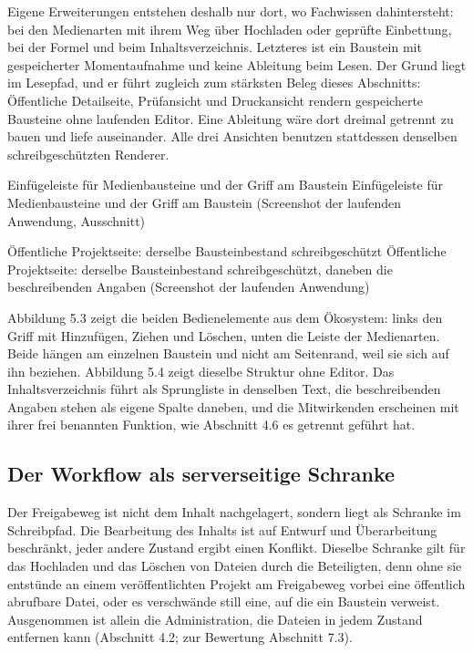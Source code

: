 Eigene Erweiterungen entstehen deshalb nur dort, wo Fachwissen dahintersteht: bei den Medienarten mit ihrem Weg über Hochladen oder geprüfte Einbettung, bei der Formel und beim Inhaltsverzeichnis. Letzteres ist ein Baustein mit gespeicherter Momentaufnahme und keine Ableitung beim Lesen. Der Grund liegt im Lesepfad, und er führt zugleich zum stärksten Beleg dieses Abschnitts: Öffentliche Detailseite, Prüfansicht und Druckansicht rendern gespeicherte Bausteine ohne laufenden Editor. Eine Ableitung wäre dort dreimal getrennt zu bauen und liefe auseinander. Alle drei Ansichten benutzen stattdessen denselben schreibgeschützten Renderer.

%
{Einfügeleiste für Medienbausteine und der Griff am Baustein}%
{Einfügeleiste für Medienbausteine und der Griff am Baustein (Screenshot der laufenden Anwendung, Ausschnitt)}

%
{Öffentliche Projektseite: derselbe Bausteinbestand schreibgeschützt}%
{Öffentliche Projektseite: derselbe Bausteinbestand schreibgeschützt, daneben die beschreibenden Angaben (Screenshot der laufenden Anwendung)}

Abbildung 5.3 zeigt die beiden Bedienelemente aus dem Ökosystem: links den Griff mit Hinzufügen, Ziehen und Löschen, unten die Leiste der Medienarten. Beide hängen am einzelnen Baustein und nicht am Seitenrand, weil sie sich auf ihn beziehen. Abbildung 5.4 zeigt dieselbe Struktur ohne Editor. Das Inhaltsverzeichnis führt als Sprungliste in denselben Text, die beschreibenden Angaben stehen als eigene Spalte daneben, und die Mitwirkenden erscheinen mit ihrer frei benannten Funktion, wie Abschnitt 4.6 es getrennt geführt hat.

\subsection{Der Workflow als serverseitige Schranke}

Der Freigabeweg ist nicht dem Inhalt nachgelagert, sondern liegt als Schranke im Schreibpfad. Die Bearbeitung des Inhalts ist auf Entwurf und Überarbeitung beschränkt, jeder andere Zustand ergibt einen Konflikt. Dieselbe Schranke gilt für das Hochladen und das Löschen von Dateien durch die Beteiligten, denn ohne sie entstünde an einem veröffentlichten Projekt am Freigabeweg vorbei eine öffentlich abrufbare Datei, oder es verschwände still eine, auf die ein Baustein verweist. Ausgenommen ist allein die Administration, die Dateien in jedem Zustand entfernen kann (Abschnitt 4.2; zur Bewertung Abschnitt 7.3).

